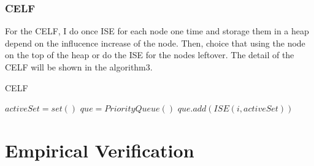\documentclass[conference,compsoc]{IEEEtran}
\begin{document}
    \subsubsection{CELF}
      For the CELF, I do once ISE for each node one time and storage them in a heap depend on the influcence increase of the node.
      Then, choice that using the node on the top of the heap or do the ISE for the nodes leftover.
      The detail of the CELF will be shown in the algorithm3.
      \begin{algorithm}
        \caption{CELF}
        \begin{algorithmic}[1]
            \State $activeSet = set()$
            \State $que = PriorityQueue()$
              \State $que.add(ISE(i, activeSet))$
            \EndFor
            

          \EndFunction
        \end{algorithmic}
      \end{algorithm}
\section{Empirical Verification}



\end{document}
